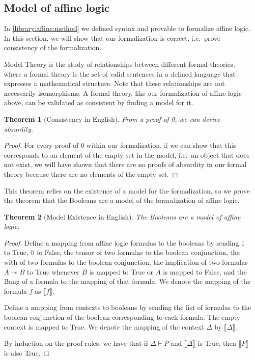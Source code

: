 \documentclass{article}
\newtheorem{thm}{Theorem}
\theoremstyle{definition}
\begin{document}
\subsection{Model of affine logic}

In \autoref{library:affine:method} we defined syntax and provable to formalize affine logic. In this section, we will show that our formalization is correct, i.e.\ prove consistency of the formalization. 

Model Theory is the study of relationships between different formal theories, where a formal theory is the set of valid sentences in a defined language that expresses a mathematical structure. Note that these relationships are not necessarily isomorphisms. A formal theory, like our formalization of affine logic above, can be validated as consistent by finding a model for it. 

\setcounter{thmconsistency}{\value{thm}}
\begin{thm}[Consistency in English]
From a proof of 0, we can derive absurdity.
\end{thm}
\begin{proof}
For every proof of 0 within our formalization, if we can show that this corresponds to an element of the empty set in the model, i.e.\ an object that does not exist, we will have shown that there are no proofs of absurdity in our formal theory because there are no elements of the empty set. 
\end{proof}

This theorem relies on the existence of a model for the formalization, so we prove the theorem that the Booleans are a model of the formalization of affine logic. 

\setcounter{thmexistence}{\value{thm}}
\begin{thm}[Model Existence in English]
The Booleans are a model of affine logic. 
\end{thm}
\begin{proof}
Define a mapping from affine logic formulas to the booleans by sending 1 to True, 0 to False, the tensor of two formulas to the boolean conjunction, the with of two formulas to the boolean conjunction, the implication of two formulas $A \multimap B$ to True whenever $B$ is mapped to True or $A$ is mapped to False, and the Bang of a formula to the mapping of that formula. We denote the mapping of the formula $f$ as $\llbracket f\rrbracket$.

Define a mapping from contexts to booleans by sending the list of formulas to the boolean conjunction of the boolean corresponding to each formula. The empty context is mapped to True. We denote the mapping of the context $\Delta$ by $\llbracket\Delta\rrbracket$.

By induction on the proof rules, we have that if $\Delta \vdash P$ and $\llbracket\Delta\rrbracket$ is True, then $\llbracket P\rrbracket$ is also True.
\end{proof}
\end{document}
